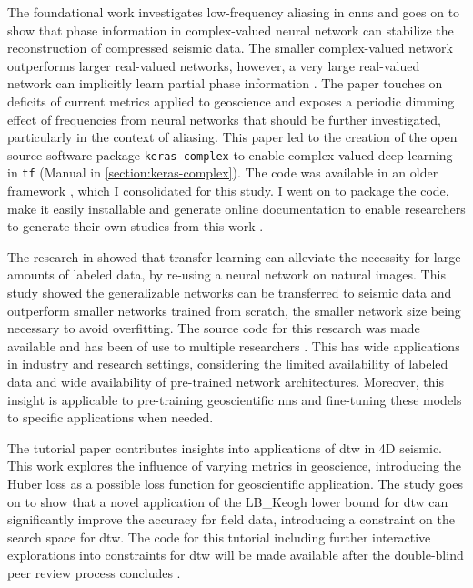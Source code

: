 The foundational work investigates low-frequency aliasing in \aclp{cnn} \citep{dramsch2018information} and goes on to show that phase information in complex-valued neural network can stabilize the reconstruction of compressed seismic data. The smaller complex-valued network outperforms larger real-valued networks, however, a very large real-valued network can implicitly learn partial phase information \citep{dramsch2019complex}. The paper touches on deficits of current metrics applied to geoscience and exposes a periodic dimming effect of frequencies from neural networks that should be further investigated, particularly in the context of aliasing. This paper led to the creation of the open source software package \texttt{keras complex} to enable complex-valued deep learning in \texttt{\acl{tf}} (Manual in \ref{section:keras-complex}). The code was available in an older framework \citep{trabelsi2017deep}, which I consolidated for this study. I went on to package the code, make it easily installable and generate online documentation to enable researchers to generate their own studies from this work \citep{dramsch2019complexcode}.

The research in \citet{dramsch2018deep} showed that transfer learning can alleviate the necessity for large amounts of labeled data, by re-using a neural network on natural images. This study showed the generalizable networks can be transferred to seismic data and outperform smaller networks trained from scratch, the smaller network size being necessary to avoid overfitting. The source code for this research was made available and has been of use to multiple researchers \citep{dramsch2018deepcode}. This has wide applications in industry and research settings, considering the limited availability of labeled data and wide availability of pre-trained network architectures. Moreover, this insight is applicable to pre-training geoscientific \aclp{nn} and fine-tuning these models to specific applications when needed.

The tutorial paper \citep{dramsch2019dtw} contributes insights into applications of \acl{dtw} in 4D seismic. This work explores the influence of varying metrics in geoscience, introducing the Huber loss as a possible loss function for geoscientific application. The study goes on to show that a novel application of the LB\_Keogh lower bound for \acl{dtw} can significantly improve the accuracy for field data, introducing a constraint on the search space for \acl{dtw}. The code for this tutorial including further interactive explorations into constraints for \acl{dtw} will be made available after the double-blind peer review process concludes \citep{dramsch2020dtwcode}.

